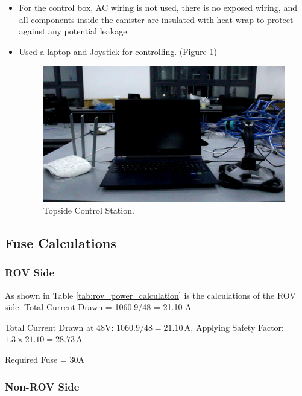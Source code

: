 \documentclass[11pt, twocolumn]{article}
\begin{document}
\begin{itemize}[leftmargin=0pt, itemindent=10pt]
    \setlength{\itemsep}{0pt}
    \item For the control box, AC wiring is not used, there is no exposed wiring, and all components inside the canister are insulated with heat wrap to protect against any potential leakage.
    
    \item Used a laptop and Joystick for controlling. (Figure \ref{fig:station})
    
    \begin{figure}[h!]
        \centering
        \includegraphics[width=0.8\columnwidth]{Images/Station.png}
        \caption{Topside Control Station.}
        \label{fig:station}
    \end{figure}
\end{itemize}

\vspace{-0.3cm}
\subsection{Fuse Calculations}
\subsubsection{ROV Side}

As shown in Table \ref{tab:rov_power_calculation} is the calculations of the ROV side. Total Current Drawn = 1060.9/48 = 21.10 A

Total Current Drawn at 48V: \( 1060.9 / 48 = 21.10 \, \text{A} \), Applying Safety Factor: \( 1.3 \times 21.10 = 28.73 \, \text{A} \)
\setlength{\parskip}{0pt}

Required Fuse = 30A

\subsubsection{Non-ROV Side}
\end{document}
